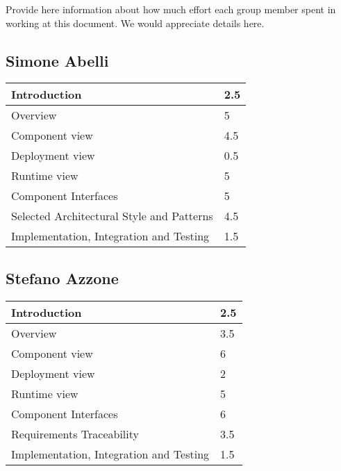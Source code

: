 Provide here information about how much effort each group member spent in working at this document. We would appreciate details here.\\

\subsection{Simone Abelli}
\begin{tabular} { | m{5cm} | m{1cm} | }
	\hline
	Introduction & 2.5\\
	\hline
	Overview & 5\\
	\hline
	Component view & 4.5\\
	\hline
	Deployment view & 0.5\\
	\hline
	Runtime view & 5\\
	\hline
	Component Interfaces & 5\\
	\hline
	Selected Architectural Style and Patterns & 4.5\\
	\hline
	Implementation, Integration and Testing & 1.5\\
	\hline
\end{tabular}

\subsection{Stefano Azzone}
\begin{tabular} { | m{5cm} | m{1cm} | }
	\hline
	Introduction & 2.5\\
	\hline
	Overview & 3.5\\
	\hline
	Component view & 6\\
	\hline
	Deployment view & 2\\
	\hline
	Runtime view & 5\\
	\hline
	Component Interfaces & 6\\
	\hline
	Requirements Traceability & 3.5\\
	\hline
	Implementation, Integration and Testing & 1.5\\
	\hline
\end{tabular}